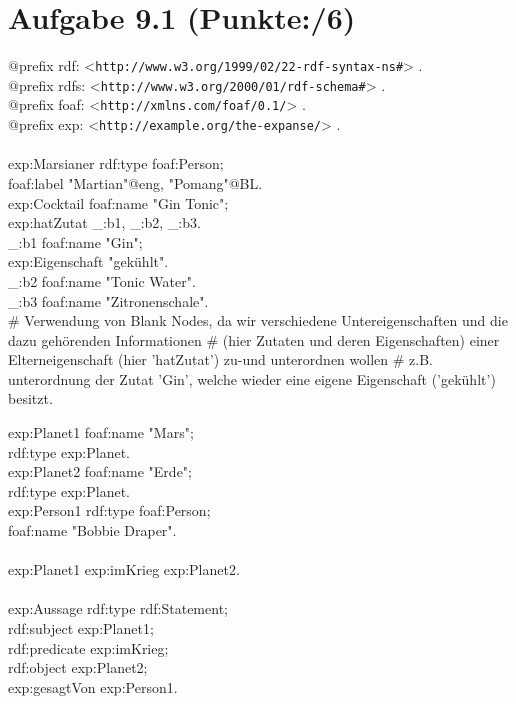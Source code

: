 \documentclass[11pt, a4paper]{article}
\newcommand{\blattnummer}{9}
\newcommand{\p}{6}
\newcommand{\aufgabe}[2] {\section*{Aufgabe \blattnummer.#1 (Punkte:\qquad/#2)}}
\begin{document}
\aufgabe{1}{\p}
\begin{adjustwidth}{20pt}{20pt}
\begin{tt}
$@$prefix rdf: <\nolinkurl{http://www.w3.org/1999/02/22-rdf-syntax-ns#}> .\\
$@$prefix rdfs: <\nolinkurl{http://www.w3.org/2000/01/rdf-schema#}> .\\
$@$prefix foaf: <\nolinkurl{http://xmlns.com/foaf/0.1/}> .\\
$@$prefix exp: <\nolinkurl{http://example.org/the-expanse/}> .\\
\ \\
exp:Marsianer rdf:type foaf:Person;\\
\null \qquad              foaf:label "Martian"@eng, "Pomang"@BL.\\
		   
exp:Cocktail foaf:name "Gin Tonic";\\
\null \qquad             exp:hatZutat \_:b1, \_:b2, \_:b3.\\
\_:b1 foaf:name "Gin";\\
\null\qquad     exp:Eigenschaft "gekühlt".\\
\_:b2 foaf:name "Tonic Water".\\
\_:b3 foaf:name "Zitronenschale".\\

\# Verwendung von Blank Nodes, da wir verschiedene Untereigenschaften und die dazu gehörenden Informationen
\# (hier Zutaten und deren Eigenschaften) einer Elterneigenschaft (hier 'hatZutat') zu-und unterordnen wollen
\# z.B. unterordnung der Zutat 'Gin', welche wieder eine eigene Eigenschaft ('gekühlt') besitzt.

exp:Planet1 foaf:name "Mars";\\
\null\qquad            rdf:type exp:Planet.\\
exp:Planet2 foaf:name "Erde";\\
\null\qquad            rdf:type exp:Planet.\\
exp:Person1 rdf:type foaf:Person;\\
\null\qquad            foaf:name "Bobbie Draper".\\
\ \\		
exp:Planet1 exp:imKrieg exp:Planet2.\\
\ \\
exp:Aussage rdf:type rdf:Statement;\\
\null\qquad            rdf:subject exp:Planet1;\\
\null\qquad            rdf:predicate exp:imKrieg;\\
\null\qquad            rdf:object exp:Planet2;\\
\null\qquad            exp:gesagtVon exp:Person1.
\end{tt}
\end{adjustwidth}
\end{document}
